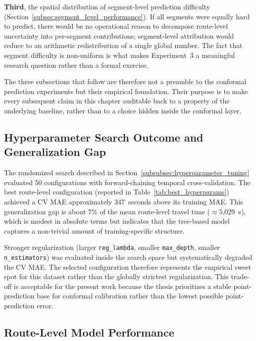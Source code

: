 \textbf{Third}, the spatial distribution of segment-level prediction difficulty (Section~\ref{subsec:segment_level_performance}). If all segments were equally hard to predict, there would be no operational reason to decompose route-level uncertainty into per-segment contributions; segment-level attribution would reduce to an arithmetic redistribution of a single global number. The fact that segment difficulty is non-uniform is what makes Experiment~3 a meaningful research question rather than a formal exercise.

The three subsections that follow are therefore not a preamble to the conformal prediction experiments but their empirical foundation. Their purpose is to make every subsequent claim in this chapter auditable back to a property of the underlying baseline, rather than to a choice hidden inside the conformal layer.

\subsection{Hyperparameter Search Outcome and Generalization Gap}
\label{subsec:baseline_hyperparam_outcome}

The randomized search described in Section~\ref{subsubsec:hyperparameter_tuning} evaluated 50 configurations with forward-chaining temporal cross-validation. The best route-level configuration (reported in Table~\ref{tab:best_hyperparams}) achieved a CV MAE approximately 347~seconds above its training MAE. This generalization gap is about 7\% of the mean route-level travel time ($\approx$5,029~s), which is modest in absolute terms but indicates that the tree-based model captures a non-trivial amount of training-specific structure.

Stronger regularization (larger \texttt{reg\_lambda}, smaller \texttt{max\_depth}, smaller \texttt{n\_estimators}) was evaluated inside the search space but systematically degraded the CV MAE. The selected configuration therefore represents the empirical sweet spot for this dataset rather than the globally strictest regularization. This trade-off is acceptable for the present work because the thesis prioritizes a stable point-prediction base for conformal calibration rather than the lowest possible point-prediction error.

\subsection{Route-Level Model Performance}
\label{subsec:route_level_performance}

